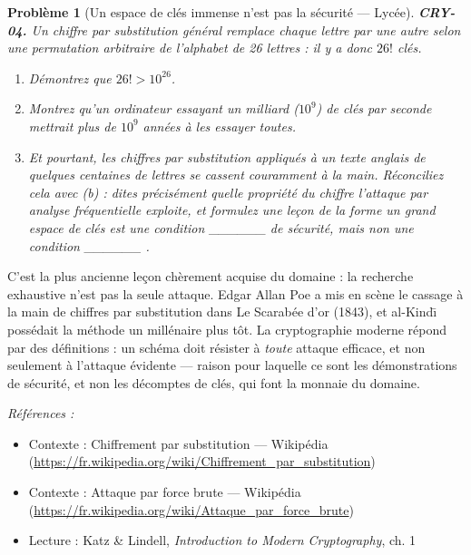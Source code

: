 \documentclass[11pt]{article}
\newtheorem{problem}{Problème}
\newenvironment{refs}{\par\small\noindent\emph{Références :}\begin{itemize}\setlength\itemsep{0pt}}{\end{itemize}\normalsize}
\begin{document}
\begin{problem}[{Un espace de clés immense n'est pas la sécurité --- Lycée}]
\textbf{CRY-04.} Un chiffre par substitution général remplace chaque
lettre par une autre selon une permutation arbitraire de l'alphabet de 26 lettres : il y a
donc $26!$ clés.
\begin{enumerate}
\item[(a)] Démontrez que $26! > 10^{26}$.
\item[(b)] Montrez qu'un ordinateur
essayant un milliard ($10^9$) de clés par seconde mettrait plus de $10^9$ années
à les essayer toutes.
\item[(c)] Et pourtant, les chiffres par substitution appliqués à un texte
anglais de quelques centaines de lettres se cassent couramment à la main. Réconciliez cela
avec (b) : dites précisément quelle propriété du chiffre l'attaque par analyse fréquentielle
exploite, et formulez une leçon de la forme \og{} un grand espace de clés est une condition
\_\_\_\_\_\_ de sécurité, mais non une condition \_\_\_\_\_\_ \fg{}.
\end{enumerate}

\end{problem}

\noindent C'est la plus ancienne leçon chèrement acquise du domaine : la recherche
exhaustive n'est pas la seule attaque. Edgar Allan Poe a mis en scène le cassage à la main
de chiffres par substitution dans \og{} Le Scarabée d'or \fg{} (1843), et al-Kind\={\i} possédait la
méthode un millénaire plus tôt. La cryptographie moderne répond par des définitions : un
schéma doit résister à \textit{toute} attaque efficace, et non seulement à l'attaque évidente ---
raison pour laquelle ce sont les démonstrations de sécurité, et non les décomptes de clés,
qui font la monnaie du domaine.

\begin{refs}
\item Contexte : Chiffrement par substitution --- Wikipédia (\url{https://fr.wikipedia.org/wiki/Chiffrement_par_substitution})
\item Contexte : Attaque par force brute --- Wikipédia (\url{https://fr.wikipedia.org/wiki/Attaque_par_force_brute})
\item Lecture : Katz \& Lindell, \textit{Introduction to Modern Cryptography}, ch. 1
\end{refs}

\bigskip
\end{document}
